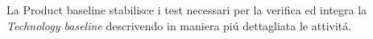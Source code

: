 La Product baseline stabilisce i test necessari per la verifica ed integra la \emph{Technology baseline} descrivendo in maniera pi\'{u} dettagliata le attivit\'{a}.